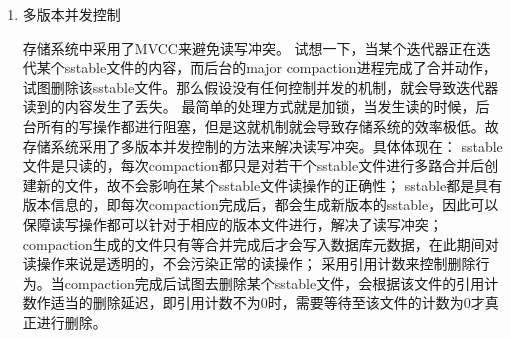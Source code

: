 \begin{enumerate}
		\item 多版本并发控制

存储系统中采用了MVCC来避免读写冲突。
试想一下，当某个迭代器正在迭代某个sstable文件的内容，而后台的major compaction进程完成了合并动作，试图删除该sstable文件。那么假设没有任何控制并发的机制，就会导致迭代器读到的内容发生了丢失。
最简单的处理方式就是加锁，当发生读的时候，后台所有的写操作都进行阻塞，但是这就机制就会导致存储系统的效率极低。故存储系统采用了多版本并发控制的方法来解决读写冲突。具体体现在：
sstable文件是只读的，每次compaction都只是对若干个sstable文件进行多路合并后创建新的文件，故不会影响在某个sstable文件读操作的正确性；
sstable都是具有版本信息的，即每次compaction完成后，都会生成新版本的sstable，因此可以保障读写操作都可以针对于相应的版本文件进行，解决了读写冲突；
compaction生成的文件只有等合并完成后才会写入数据库元数据，在此期间对读操作来说是透明的，不会污染正常的读操作；
采用引用计数来控制删除行为。当compaction完成后试图去删除某个sstable文件，会根据该文件的引用计数作适当的删除延迟，即引用计数不为0时，需要等待至该文件的计数为0才真正进行删除。

\end{enumerate}